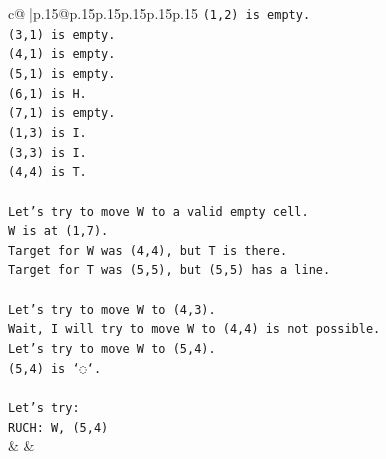 \documentclass{article}
\begin{document}
{\begin{supertabular}{c@{$\;$}|p{.15\linewidth}@{}p{.15\linewidth}p{.15\linewidth}p{.15\linewidth}p{.15\linewidth}p{.15\linewidth}}
{{{\texttt{(1,2) is empty.} \\
\texttt{(3,1) is empty.} \\
\texttt{(4,1) is empty.} \\
\texttt{(5,1) is empty.} \\
\texttt{(6,1) is H.} \\
\texttt{(7,1) is empty.} \\
\texttt{(1,3) is I.} \\
\texttt{(3,3) is I.} \\
\texttt{(4,4) is T.} \\
\\ 
\texttt{Let's try to move W to a valid empty cell.} \\
\texttt{W is at (1,7).} \\
\texttt{Target for W was (4,4), but T is there.} \\
\texttt{Target for T was (5,5), but (5,5) has a line.} \\
\\ 
\texttt{Let's try to move W to (4,3).} \\
\texttt{Wait, I will try to move W to (4,4) is not possible.} \\
\texttt{Let's try to move W to (5,4).} \\
\texttt{(5,4) is `◌`.} \\
\\ 
\texttt{Let's try:} \\
\texttt{RUCH: W, (5,4)} \\
            }
        }
    }
    & & \\ \\


\end{supertabular}}
\end{document}
